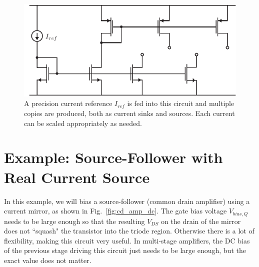  



\begin{figure}[tb]
\begin{center}
\includegraphics[scale=1]{19current_mirror_multioutput.pdf}
\end{center}
\caption{A precision current reference $I_{ref}$ is fed into this circuit and multiple copies are produced, both as current sinks and sources.  Each current can be scaled appropriately as needed.} \label{fig:19current_mirror_multioutput.pdf}
\end{figure}





\section{Example:  Source-Follower with Real Current Source}


In this example, we will bias a source-follower (common drain amplifier) using a current mirror, as shown in Fig.~\ref{fig:cd_amp_dc}.  The gate bias voltage $V_{bias,Q}$ needs to be large enough so that the resulting $V_{DS}$ on the drain of the mirror does not ``squash" the transistor into the triode region.  Otherwise there is a lot of flexibility, making this circuit very useful.  In multi-stage amplifiers, the DC bias of the previous stage driving this circuit just needs to be large enough, but the exact value does not matter.  







